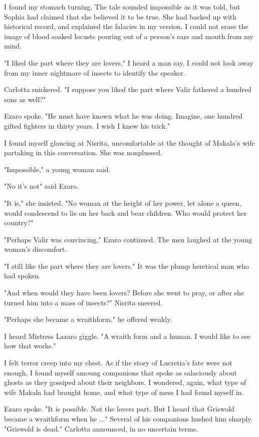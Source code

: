 \documentclass{article}
\begin{document}
I found my stomach turning. The tale sounded impossible as it was told, but Sophia had claimed that she believed it to be true. She had backed up with historical record, and explained the falacies in my version. I could not erase the image of blood soaked locusts pouring out of a person's ears and mouth from my mind. 

"I liked the part where they are lovers," I heard a man say. I could not look away from my inner nightmare of insects to identify the speaker. 

Carlotta snickered. "I suppose you liked the part where Valir fathered a hundred sons as well?"

Ezaro spoke. "He must have known what he was doing. Imagine, one hundred gifted fighters in thirty years. I wish I knew his trick."

I found myself glancing at Nisrita, uncomfortable at the thought of Makala's wife partaking in this conversation. She was nonplussed. 

"Impossible," a young woman said. 

"No it's not" said Ezaro.

"It is," she insisted. "No woman at the height of her power, let alone a queen, would condescend to lie on her back and bear children. Who would protect her country?"

"Perhaps Valir was convincing," Ezaro continued. The men laughed at the young woman's discomfort.

"I still like the part where they are lovers." It was the plump heretical man who had spoken.

"And when would they have been lovers? Before she went to pray, or after she turned him into a mass of insects?" Nisrita sneered.

"Perhaps she became a wraithform," he offered weakly.

I heard Mistress Lazaro giggle. "A wraith form and a human. I would like to see how that works."

I felt terror creep into my chest. As if the story of Lucretia's fate were not enough, I found myself amoung companions that spoke as salaciously about ghosts as they gossiped about their neighbors. I wondered, again, what type of wife Makala had brought home, and what type of mess I had found myself in. 

Ezaro spoke. "It is possible. Not the lovers part. But I heard that Griswold became a wraithform when he ..." Several of his companions hushed him sharply. 
"Griswold is dead." Carlotta announced, in no uncertain terms. 
\end{document}
